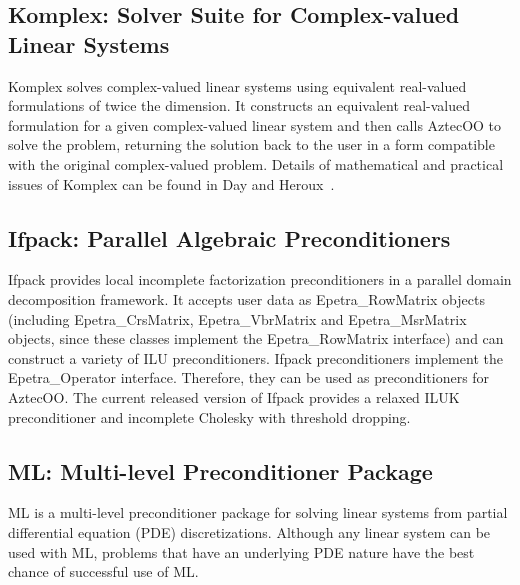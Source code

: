 \documentclass[acmtoms,acmnow]{acmtrans2m}
\begin{document}
\subsection{Komplex: Solver Suite for Complex-valued Linear Systems}

Komplex solves complex-valued linear systems using equivalent 
real-valued formulations of twice the dimension.  It constructs an 
equivalent real-valued formulation for a given complex-valued linear 
system and then calls AztecOO to solve the problem, returning the 
solution back to the user in a form compatible with the original 
complex-valued problem.  Details of mathematical and practical 
issues of Komplex can be found in Day and Heroux~\cite{DayHero2001}.

\subsection{Ifpack: Parallel Algebraic Preconditioners}

Ifpack provides local incomplete factorization preconditioners in a
parallel domain decomposition framework.  It accepts user data as 
Epetra\_RowMatrix objects (including Epetra\_CrsMatrix, 
Epetra\_VbrMatrix and Epetra\_MsrMatrix objects, since these
classes implement the Epetra\_RowMatrix interface)
and can construct a variety of ILU preconditioners.  Ifpack 
preconditioners implement the Epetra\_Operator interface.  Therefore, 
they can be used as preconditioners for AztecOO.  The current 
released version of Ifpack provides a relaxed ILUK preconditioner and
incomplete Cholesky with threshold dropping.

\subsection{ML: Multi-level Preconditioner Package}

ML is a multi-level preconditioner package for
solving linear systems
from partial differential equation (PDE) discretizations.
Although any linear system can be used with ML,
problems that have an underlying PDE nature have the best chance of successful
use of ML.
\end{document}
